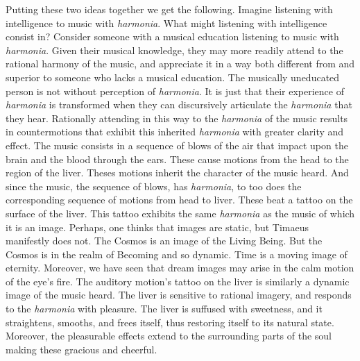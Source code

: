 Putting these two ideas together we get the following. Imagine listening with intelligence to music with \emph{harmonia}. What might listening with intelligence consist in? Consider someone with a musical education listening to music with \emph{harmonia}. Given their musical knowledge, they may more readily attend to the rational harmony of the music, and appreciate it in a way both different from and superior to someone who lacks a musical education. The musically uneducated person is not without perception of \emph{harmonia}. It is just that their experience of \emph{harmonia} is transformed when they can discursively articulate the \emph{harmonia} that they hear. Rationally attending in this way to the \emph{harmonia} of the music results in countermotions that exhibit this inherited \emph{harmonia} with greater clarity and effect. The music consists in a sequence of blows of the air that impact upon the brain and the blood through the ears. These cause motions from the head to the region of the liver. Theses motions inherit the character of the music heard. And since the music, the sequence of blows, has \emph{harmonia}, to too does the corresponding sequence of motions from head to liver. These beat a tattoo on the surface of the liver. This tattoo exhibits the same \emph{harmonia} as the music of which it is an image. Perhaps, one thinks that images are static, but Timaeus manifestly does not. The Cosmos is an image of the Living Being. But the Cosmos is in the realm of Becoming and so dynamic. Time is a moving image of eternity. Moreover, we have seen that dream images may arise in the calm motion of the eye's fire. The auditory motion's tattoo on the liver is similarly a dynamic image of the music heard. The liver is sensitive to rational imagery, and responds to the \emph{harmonia} with pleasure. The liver is suffused with sweetness, and it straightens, smooths, and frees itself, thus restoring itself to its natural state. Moreover, the pleasurable effects extend to the surrounding parts of the soul making these gracious and cheerful.

